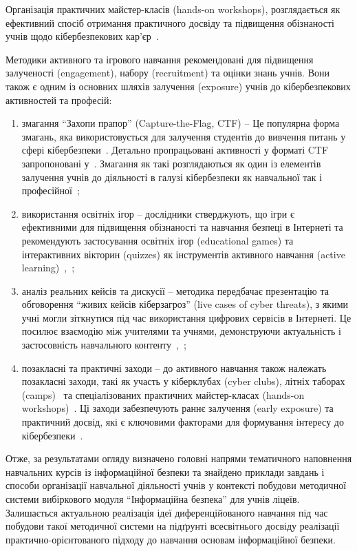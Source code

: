 Організація практичних майстер-класів (hands-on workshops), розглядається як ефективний спосіб отримання практичного досвіду та підвищення обізнаності учнів щодо кібербезпекових кар'єр~\cite{Mishra202436}.

Методики активного та ігрового навчання рекомендовані для підвищення залученості (engagement), набору (recruitment) та оцінки знань учнів. Вони також є одним із основних шляхів залучення (exposure) учнів до кібербезпекових активностей та професій:
\begin{enumerate}[label=--] %
\item
змагання ``Захопи прапор'' (Capture-the-Flag, CTF) -- Це популярна форма змагань, яка використовується для залучення  студентів до вивчення питань у сфері кібербезпеки~\cite{Gough2024394}. Детально пропрацьовані активності у форматі CTF запропоновані у~\cite{Jerman20259093}. Змагання як такі розглядаються як один із елементів залучення учнів до діяльності в галузі кібербезпеки як навчальної так і професійної~\cite{Mishra202436};
\item
використання освітніх ігор -- дослідники стверджують, що ігри є  ефективними для підвищення обізнаності та навчання безпеці в Інтернеті та рекомендують застосування освітніх ігор (educational games) та інтерактивних вікторин (quizzes) як інструментів активного навчання (active learning)~\cite{Jerman2024},~\cite{Jerman20259093};
\item
аналіз реальних кейсів та дискусії -- методика передбачає презентацію та обговорення ``живих кейсів кіберзагроз'' (live cases of cyber threats), з якими учні могли зіткнутися під час використання цифрових сервісів в Інтернеті. Це посилює взаємодію між учителями та учнями, демонструючи актуальність і застосовність навчального контенту~\cite{Jerman2024},~\cite{Jerman20259093};
\item
позакласні та практичні заходи -- до активного навчання також належать позакласні заходи, такі як участь у кіберклубах (cyber clubs), літніх таборах (camps)~\cite{Jacob20222248} та спеціалізованих практичних майстер-класах (hands-on workshops)~\cite{Mishra202436}. Ці заходи забезпечують раннє залучення (early exposure) та практичний досвід, які є ключовими факторами для формування інтересу до кібербезпеки~\cite{Mishra202436}.
\end{enumerate}

Отже, за результатами огляду визначено головні напрями тематичного наповнення навчальних курсів із інформаційної безпеки та знайдено приклади завдань і способи організації навчальної діяльності учнів у контексті побудови методичної системи вибіркового модуля ``Інформаційна безпека''  для учнів ліцеїв. Залишається актуальною реалізація ідеї диференційованого навчання під час побудови такої методичної системи на підґрунті всесвітнього досвіду реалізації практично-орієнтованого підходу до навчання основам інформаційної безпеки.  

